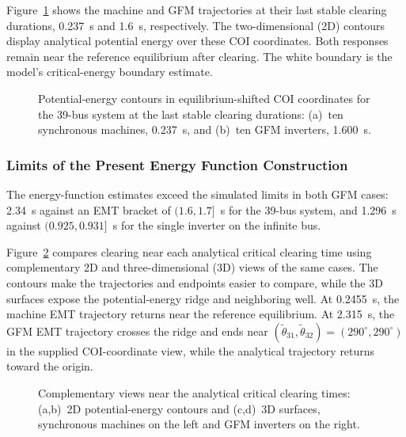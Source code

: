 \documentclass[11pt]{article}
\begin{document}
Figure~\ref{fig:esbelow} shows the machine and GFM trajectories at their last stable clearing durations, 0.237~s and 1.6~s, respectively. The two-dimensional (2D) contours display analytical potential energy over these COI coordinates. Both responses remain near the reference equilibrium after clearing. The white boundary is the model's critical-energy boundary estimate.

\begin{figure}[tbp]\centering

\caption{Potential-energy contours in equilibrium-shifted COI coordinates for the 39-bus system at the last stable clearing durations: (a)~ten synchronous machines, 0.237~s, and (b)~ten GFM inverters, 1.600~s.}
\label{fig:esbelow}
\end{figure}

\subsubsection{Limits of the Present Energy Function Construction}
\label{sec:gfmgap}
The energy-function estimates exceed the simulated limits in both GFM cases: 2.34~s against an EMT bracket of $(1.6,1.7]$~s for the 39-bus system, and 1.296~s against $(0.925,0.931]$~s for the single inverter on the infinite bus.

Figure~\ref{fig:esat} compares clearing near each analytical critical clearing time using complementary 2D and three-dimensional (3D) views of the same cases. The contours make the trajectories and endpoints easier to compare, while the 3D surfaces expose the potential-energy ridge and neighboring well. At 0.2455~s, the machine EMT trajectory returns near the reference equilibrium. At 2.315~s, the GFM EMT trajectory crosses the ridge and ends near $(\tilde\theta_{31},\tilde\theta_{32})=(290^\circ,290^\circ)$ in the supplied COI-coordinate view, while the analytical trajectory returns toward the origin.



\begin{figure}[p]\centering

\par\vspace{4pt}

\caption{Complementary views near the analytical critical clearing times: (a,b)~2D potential-energy contours and (c,d)~3D surfaces, synchronous machines on the left and GFM inverters on the right.}
\label{fig:esat}
\end{figure}
\end{document}
